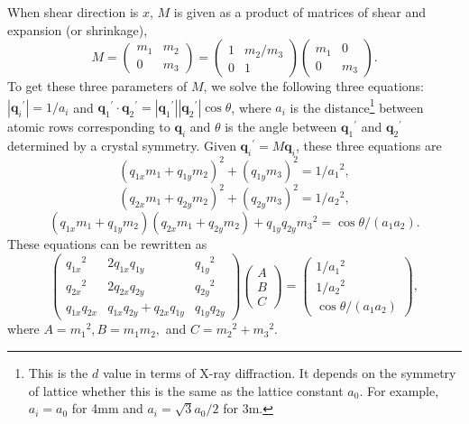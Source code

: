 \documentclass[a4paper]{article}
\begin{document}
When shear direction is $x$, $M$ is given as a product of matrices of shear and expansion (or shrinkage),
\begin{equation}
M=\left(
\begin{array}{cc}
m_1 & m_2 \\
0 & m_3
\end{array}
\right)=\left(
\begin{array}{cc}
1 & m_2/m_3 \\
0 & 1
\end{array}
\right)\left(
\begin{array}{cc}
m_1 & 0 \\
0 & m_3
\end{array}
\right).
\label{eq:mx}
\end{equation}
To get these three parameters of $M$, we solve the following three equations: $|{\boldsymbol{q}_i}^\prime|=1/a_i$ and ${\boldsymbol{q}_1}^\prime\cdot{\boldsymbol{q}_2}^\prime=|{\boldsymbol{q}_1}^\prime||{\boldsymbol{q}_2}^\prime|\cos\theta$, where $a_i$ is the distance\footnote{This is the $d$ value in terms of X-ray diffraction. It depends on the symmetry of lattice whether this is the same as the lattice constant $a_0$. For example, $a_i=a_0$ for 4mm and $a_i = \sqrt{3}a_0/2$ for 3m.} between atomic rows corresponding to $\boldsymbol{q}_i$ and $\theta$ is the angle between ${\boldsymbol{q}_1}^\prime$ and ${\boldsymbol{q}_2}^\prime$ determined by a crystal symmetry.
Given ${\boldsymbol{q}_i}^\prime = M\boldsymbol{q}_i$, these three equations are
\begin{equation}
(q_{1x}m_1+q_{1y}m_2)^2+(q_{1y}m_3)^2 = 1/{a_1}^2,
\end{equation}
\begin{equation}
(q_{2x}m_1+q_{2y}m_2)^2+(q_{2y}m_3)^2 = 1/{a_2}^2,
\end{equation}
\begin{equation}
(q_{1x}m_1+q_{1y}m_2)(q_{2x}m_1+q_{2y}m_2)+q_{1y}q_{2y}{m_3}^2 = \cos\theta/(a_1a_2).
\end{equation}
These equations can be rewritten as
\begin{equation}
\left(
\begin{array}{ccc}
{q_{1x}}^2 & 2q_{1x}q_{1y} & {q_{1y}}^2 \\
{q_{2x}}^2 & 2q_{2x}q_{2y} & {q_{2y}}^2 \\
q_{1x}q_{2x} & q_{1x}q_{2y}+q_{2x}q_{1y} & q_{1y}q_{2y} 
\end{array}
\right)\left(
\begin{array}{c}
A\\B\\C
\end{array}
\right)=\left(\!
\begin{array}{c}
1/{a_1}^2\\
1/{a_2}^2\\
\cos\theta/(a_1a_2)
\end{array}
\right),
\label{eq:main}
\end{equation}
where $A = {m_1}^2, B = m_1m_2,$ and $C = {m_2}^2+{m_3}^2$.
\end{document}
